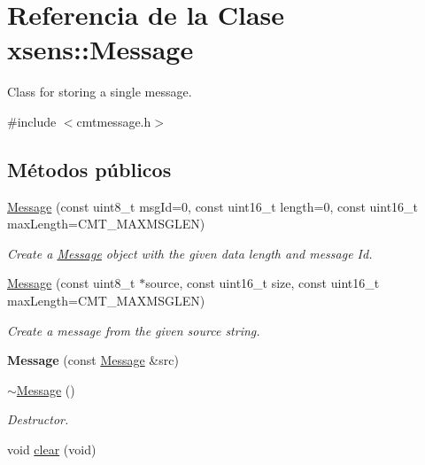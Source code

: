 \hypertarget{classxsens_1_1Message}{\section{\-Referencia de la \-Clase xsens\-:\-:\-Message}
\label{classxsens_1_1Message}
}


\-Class for storing a single message.  




{\ttfamily \#include $<$cmtmessage.\-h$>$}

\subsection*{\-Métodos públicos}
\begin{DoxyCompactItemize}
\item 
\hyperlink{classxsens_1_1Message_aea84ce1921894f8e39a4a70da798dabf}{\-Message} (const uint8\-\_\-t msg\-Id=0, const uint16\-\_\-t length=0, const uint16\-\_\-t max\-Length=\-C\-M\-T\-\_\-\-M\-A\-X\-M\-S\-G\-L\-E\-N)
\begin{DoxyCompactList}\small\item\em \-Create a \hyperlink{classxsens_1_1Message}{\-Message} object with the given data length and message \-Id. \end{DoxyCompactList}\item 
\hyperlink{classxsens_1_1Message_a075723b86f9f49a178b4c327f9e92d81}{\-Message} (const uint8\-\_\-t $\ast$source, const uint16\-\_\-t size, const uint16\-\_\-t max\-Length=\-C\-M\-T\-\_\-\-M\-A\-X\-M\-S\-G\-L\-E\-N)
\begin{DoxyCompactList}\small\item\em \-Create a message from the given source string. \end{DoxyCompactList}\item 
\hypertarget{classxsens_1_1Message_ab26a9c29cdd46af9d554c85ca466f1e5}{{\bfseries \-Message} (const \hyperlink{classxsens_1_1Message}{\-Message} \&src)}\label{classxsens_1_1Message_ab26a9c29cdd46af9d554c85ca466f1e5}

\item 
\hypertarget{classxsens_1_1Message_a8cd4cc13aebfcd861727f311877cbfdf}{\hyperlink{classxsens_1_1Message_a8cd4cc13aebfcd861727f311877cbfdf}{$\sim$\-Message} ()}\label{classxsens_1_1Message_a8cd4cc13aebfcd861727f311877cbfdf}

\begin{DoxyCompactList}\small\item\em \-Destructor. \end{DoxyCompactList}\item 
\hypertarget{classxsens_1_1Message_a8f4333f50bb8a1b4989f8179025c6e8f}{void \hyperlink{classxsens_1_1Message_a8f4333f50bb8a1b4989f8179025c6e8f}{clear} (void)}\label{classxsens_1_1Message_a8f4333f50bb8a1b4989f8179025c6e8f}


\end{DoxyCompactItemize}
